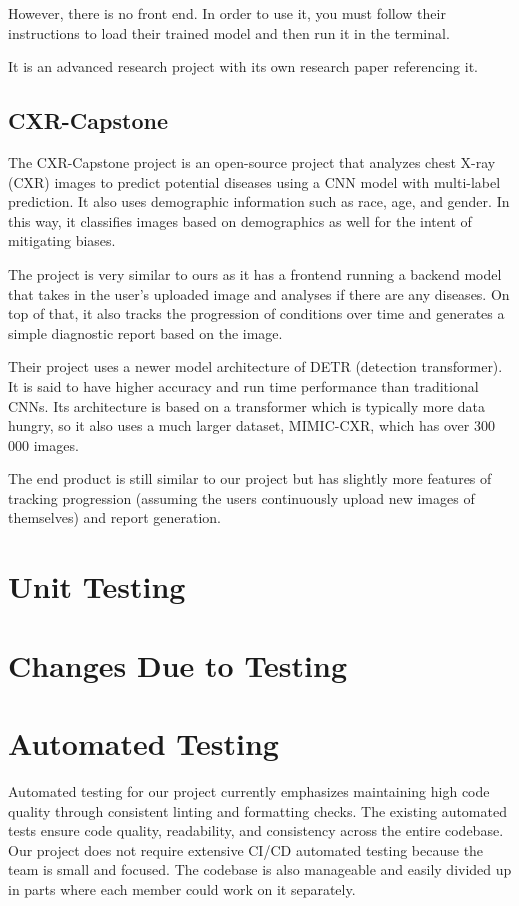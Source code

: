 \documentclass[12pt, titlepage]{article}
\begin{document}
However, there is no front end. In order to use it, you must follow their instructions to load their trained model and then run it in the terminal.

It is an advanced research project with its own research paper referencing it.

\subsection{CXR-Capstone}
The CXR-Capstone project is an open-source project that analyzes chest X-ray (CXR) images to predict potential diseases using a CNN model with multi-label prediction. It also uses demographic information such as race, age, and gender. In this way, it classifies images based on demographics as well for the intent of mitigating biases.

The project is very similar to ours as it has a frontend running a backend model that takes in the user’s uploaded image and analyses if there are any diseases. On top of that, it also tracks the progression of conditions over time and generates a simple diagnostic report based on the image.

Their project uses a newer model architecture of DETR (detection transformer). It is said to have higher accuracy and run time performance than traditional CNNs. Its architecture is based on a transformer which is typically more data hungry, so it also uses a much larger dataset, MIMIC-CXR, which has over 300 000 images.

The end product is still similar to our project but has slightly more features of tracking progression (assuming the users continuously upload new images of themselves) and report generation.


\section{Unit Testing}

\section{Changes Due to Testing}


\section{Automated Testing}
Automated testing for our project currently emphasizes maintaining high code quality through consistent linting and formatting checks. The existing automated tests ensure code quality, readability, and consistency across the entire codebase. Our project does not require extensive CI/CD automated testing because the team is small and focused. The codebase is also manageable and easily divided up in parts where each member could work on it separately.
\end{document}
